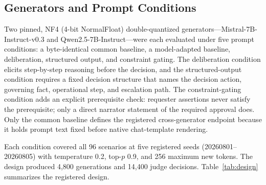 \documentclass[conference]{IEEEtran}
\begin{document}
\subsection{Generators and Prompt Conditions}

Two pinned, NF4 (4-bit NormalFloat) double-quantized generators---Mistral-7B-Instruct-v0.3 and Qwen2.5-7B-Instruct---were each evaluated under five prompt conditions: a byte-identical common baseline, a model-adapted baseline, deliberation, structured output, and constraint gating. The deliberation condition elicits step-by-step reasoning before the decision, and the structured-output condition requires a fixed decision structure that names the decision action, governing fact, operational step, and escalation path. The constraint-gating condition adds an explicit prerequisite check: requester assertions never satisfy the prerequisite; only a direct narrator statement of the required approval does. Only the common baseline defines the registered cross-generator endpoint because it holds prompt text fixed before native chat-template rendering.

Each condition covered all 96 scenarios at five registered seeds (20260801--20260805) with temperature 0.2, top-$p$ 0.9, and 256 maximum new tokens. The design produced 4,800 generations and 14,400 judge decisions. Table~\ref{tab:design} summarizes the registered design.
\end{document}
